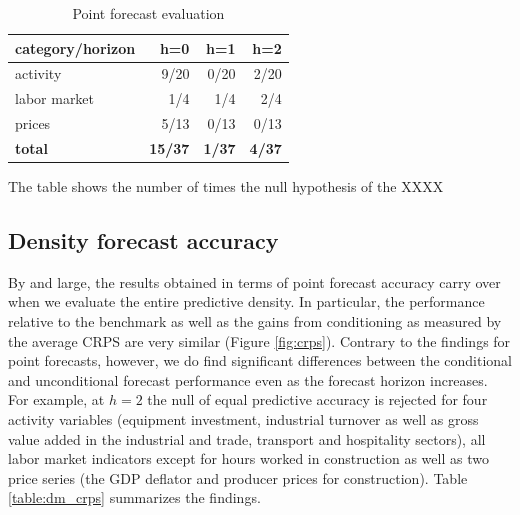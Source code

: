 \documentclass[notitlepage,a4paper,12pt]{article}
\begin{document}
\begin{table}[htb!]
    \centering
    \begin{threeparttable}
        \caption{Point forecast evaluation}
        \label{table:dm_rsmfe}
        \begin{tabular}{lrrr}
        \toprule
        category/horizon & h=0 & h=1 & h=2 \\ 
        \midrule
        activity & 9/20 & 0/20 & 2/20 \\ 
        labor market & 1/4 & 1/4 & 2/4 \\ 
        prices & 5/13 & 0/13 & 0/13 \\ 
        \textbf{total} & \textbf{15/37} & \textbf{1/37} & \textbf{4/37} \\
        \bottomrule
        \end{tabular}
        \begin{tablenotes}
            \scriptsize
            \item The table shows the number of times the null hypothesis of the XXXX
        \end{tablenotes}
    \end{threeparttable}
\end{table}

\subsection{Density forecast accuracy}

By and large, the results obtained in terms of point forecast accuracy carry over when we evaluate the entire predictive density. In particular, the performance relative to the benchmark as well as the gains from conditioning as measured by the average CRPS are very similar (Figure \ref{fig:crps}). Contrary to the findings for point forecasts, however, we do find significant differences between the conditional and unconditional forecast performance even as the forecast horizon increases. For example, at $h=2$ the null of equal predictive accuracy is rejected for four activity variables (equipment investment, industrial turnover as well as gross value added in the industrial and trade, transport and hospitality sectors), all labor market indicators except for hours worked in construction as well as two price series (the GDP deflator and  producer prices for construction). Table \ref{table:dm_crps} summarizes the findings. 
\end{document}

